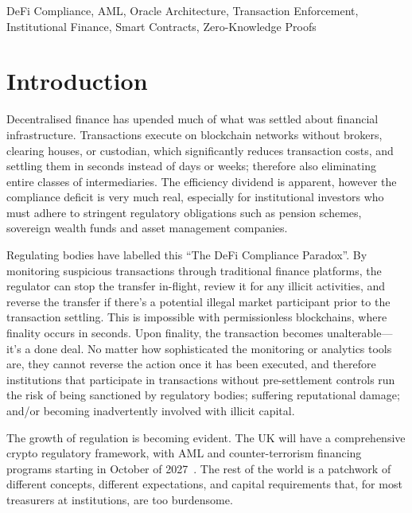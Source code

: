 \documentclass[journal]{IEEEtran}
\begin{document}
\begin{IEEEkeywords}
DeFi Compliance, AML, Oracle Architecture, Transaction Enforcement, Institutional Finance, Smart Contracts, Zero-Knowledge Proofs
\end{IEEEkeywords}

\section{Introduction}

Decentralised finance has upended much of what was settled about financial infrastructure. Transactions execute on blockchain networks without brokers, clearing houses, or custodian, which significantly reduces transaction costs, and settling them in seconds instead of days or weeks; therefore also eliminating entire classes of intermediaries. The efficiency dividend is apparent, however the compliance deficit is very much real, especially for institutional investors who must adhere to stringent regulatory obligations such as pension schemes, sovereign wealth funds and asset management companies.

Regulating bodies have labelled this ``The DeFi Compliance Paradox''. By monitoring suspicious transactions through traditional finance platforms, the regulator can stop the transfer in-flight, review it for any illicit activities, and reverse the transfer if there's a potential illegal market participant prior to the transaction settling. This is impossible with permissionless blockchains, where finality occurs in seconds. Upon finality, the transaction becomes unalterable---it's a done deal. No matter how sophisticated the monitoring or analytics tools are, they cannot reverse the action once it has been executed, and therefore institutions that participate in transactions without pre-settlement controls run the risk of being sanctioned by regulatory bodies; suffering reputational damage; and/or becoming inadvertently involved with illicit capital.

The growth of regulation is becoming evident. The UK will have a comprehensive crypto regulatory framework, with AML and counter-terrorism financing programs starting in October of 2027~\cite{fca2025}. The rest of the world is a patchwork of different concepts, different expectations, and capital requirements that, for most treasurers at institutions, are too burdensome.
\end{document}
